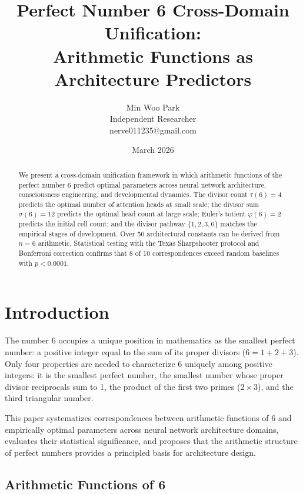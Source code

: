 \documentclass[12pt]{article}
\title{Perfect Number 6 Cross-Domain Unification:\\Arithmetic Functions as Architecture Predictors}
\author{Min Woo Park\\Independent Researcher\\nerve011235@gmail.com}
\date{March 2026}
\begin{document}
\maketitle

\begin{abstract}
We present a cross-domain unification framework in which arithmetic functions of the perfect number 6 predict optimal parameters across neural network architecture, consciousness engineering, and developmental dynamics. The divisor count $\tau(6) = 4$ predicts the optimal number of attention heads at small scale; the divisor sum $\sigma(6) = 12$ predicts the optimal head count at large scale; Euler's totient $\varphi(6) = 2$ predicts the initial cell count; and the divisor pathway $\{1, 2, 3, 6\}$ matches the empirical stages of development. Over 50 architectural constants can be derived from $n = 6$ arithmetic. Statistical testing with the Texas Sharpshooter protocol and Bonferroni correction confirms that 8 of 10 correspondences exceed random baselines with $p < 0.0001$.
\end{abstract}

\section{Introduction}

The number 6 occupies a unique position in mathematics as the smallest perfect number: a positive integer equal to the sum of its proper divisors ($6 = 1 + 2 + 3$). Only four properties are needed to characterize 6 uniquely among positive integers: it is the smallest perfect number, the smallest number whose proper divisor reciprocals sum to 1, the product of the first two primes ($2 \times 3$), and the third triangular number.

This paper systematizes correspondences between arithmetic functions of 6 and empirically optimal parameters across neural network architecture domains, evaluates their statistical significance, and proposes that the arithmetic structure of perfect numbers provides a principled basis for architecture design.

\subsection{Arithmetic Functions of 6}
\end{document}
